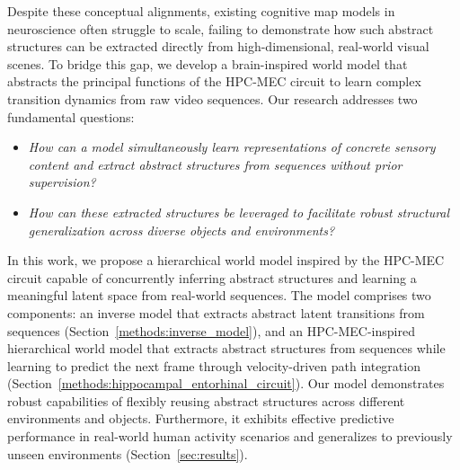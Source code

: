 Despite these conceptual alignments, existing cognitive map models in neuroscience often struggle to scale, failing to demonstrate how such abstract structures can be extracted directly from high-dimensional, real-world visual scenes. To bridge this gap, we develop a brain-inspired world model that abstracts the principal functions of the HPC-MEC circuit to learn complex transition dynamics from raw video sequences. Our research addresses two fundamental questions:

\begin{itemize}
\vspace{-0.2 cm}
\item \textit{How can a model simultaneously learn representations of concrete sensory content and extract abstract structures from sequences without prior supervision?}
\item \textit{How can these extracted structures be leveraged to facilitate robust structural generalization across diverse objects and environments?}
\vspace{-0.2 cm}
\end{itemize}

In this work, we propose a hierarchical world model inspired by the HPC-MEC circuit capable of concurrently inferring abstract structures and learning a meaningful latent space from real-world sequences. 
The model comprises two components: an inverse model that extracts abstract latent transitions from sequences (Section~\ref{methods:inverse_model}), and an HPC-MEC-inspired hierarchical world model that extracts abstract structures from sequences while learning to predict the next frame through velocity-driven path integration (Section~\ref{methods:hippocampal_entorhinal_circuit}).
Our model demonstrates robust capabilities of flexibly reusing abstract structures across different environments and objects. Furthermore, it exhibits effective predictive performance in real-world human activity scenarios and generalizes to previously unseen environments (Section~\ref{sec:results}).

